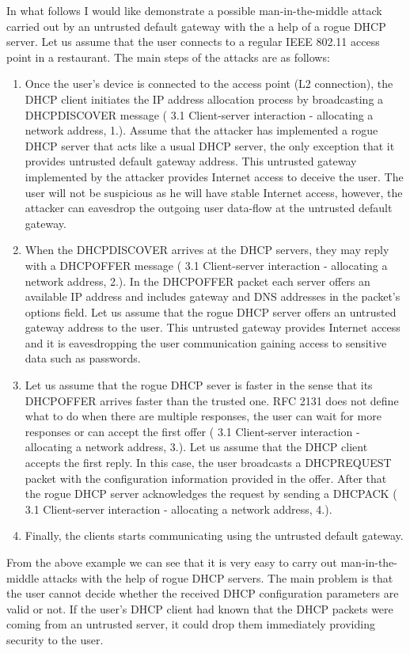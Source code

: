 \documentclass[letterpaper, 10 pt, conference]{ieeeconf}  %
\begin{document}
In what follows I would like demonstrate a possible man-in-the-middle attack carried out by an untrusted default gateway with the a help of a rogue DHCP server. Let us assume that the user connects to a regular IEEE 802.11 access point in a restaurant. The main steps of the attacks are as follows:
\begin{enumerate}
\item Once the user's device is connected to the access point (L2 connection), the DHCP client initiates the IP address allocation process by broadcasting a DHCPDISCOVER message (\cite{dhcprfc} 3.1 Client-server interaction - allocating a network address, 1.). Assume that the attacker has implemented a rogue DHCP server that acts like a usual DHCP server, the only exception that it provides untrusted default gateway address. This untrusted gateway implemented by the attacker provides Internet access to deceive the user. The user will not be suspicious as he will have stable Internet access, however, the attacker can eavesdrop the outgoing user data-flow at the untrusted default gateway.
\item When the DHCPDISCOVER arrives at the DHCP servers, they may reply with a DHCPOFFER message (\cite{dhcprfc} 3.1 Client-server interaction - allocating a network address, 2.). In the DHCPOFFER packet each server offers an available IP address and includes gateway and DNS addresses in the packet's options field. Let us assume that the rogue DHCP server offers an untrusted gateway address to the user. This untrusted gateway provides Internet access and it is eavesdropping the user communication gaining access to sensitive data such as passwords.
\item Let us assume that the rogue DHCP sever is faster in the sense that its DHCPOFFER arrives faster than the trusted one. RFC 2131 does not define what to do when there are multiple responses, the user can wait for more responses or can accept the first offer (\cite{dhcprfc} 3.1 Client-server interaction - allocating a network address, 3.). Let us assume that the DHCP client accepts the first reply. In this case, the user broadcasts a DHCPREQUEST packet with the configuration information provided in the offer. After that the rogue DHCP server acknowledges the request by sending a DHCPACK (\cite{dhcprfc} 3.1 Client-server interaction - allocating a network address, 4.).
\item Finally, the clients starts communicating using the untrusted default gateway.
\end{enumerate}
From the above example we can see that it is very easy to carry out man-in-the-middle attacks with the help of rogue DHCP servers. The main problem is that the user cannot decide whether the received DHCP configuration parameters are valid or not. If the user's DHCP client had known that the DHCP packets were coming from an untrusted server, it could drop them immediately providing security to the user.
\end{document}
